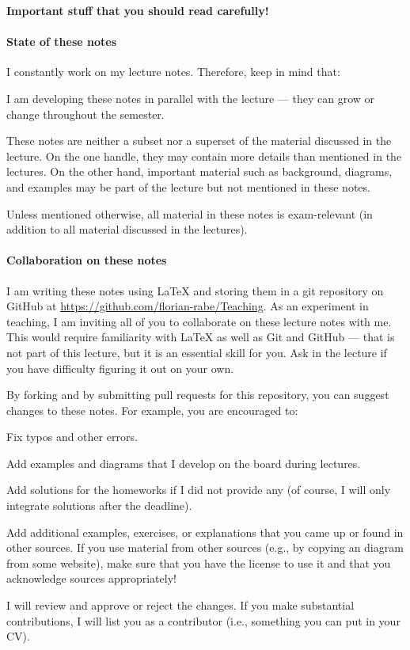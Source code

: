\begin{center}
\textbf{Important stuff that you should read carefully!}
\end{center}

\paragraph{State of these notes}
I constantly work on my lecture notes.
Therefore, keep in mind that:
\begin{compactitem}
\item I am developing these notes in parallel with the lecture --- they can grow or change throughout the semester.
\item These notes are neither a subset nor a superset of the material discussed in the lecture. On the one handle, they may contain more details than mentioned in the lectures. On the other hand, important material such as background, diagrams, and examples may be part of the lecture but not mentioned in these notes.
\item Unless mentioned otherwise, all material in these notes is exam-relevant (in addition to all material discussed in the lectures).
\end{compactitem}
\medskip

\paragraph{Collaboration on these notes}
I am writing these notes using LaTeX and storing them in a git repository on GitHub at \url{https://github.com/florian-rabe/Teaching}.
As an experiment in teaching, I am inviting all of you to collaborate on these lecture notes with me.
This would require familiarity with LaTeX as well as Git and GitHub --- that is not part of this lecture, but it is an essential skill for you.
Ask in the lecture if you have difficulty figuring it out on your own.
\medskip

By forking and by submitting pull requests for this repository, you can suggest changes to these notes.
For example, you are encouraged to:
\begin{compactitem}
\item Fix typos and other errors.
\item Add examples and diagrams that I develop on the board during lectures.
\item Add solutions for the homeworks if I did not provide any (of course, I will only integrate solutions after the deadline).
\item Add additional examples, exercises, or explanations that you came up or found in other sources.
 If you use material from other sources (e.g., by copying an diagram from some website), make sure that you have the license to use it and that you acknowledge sources appropriately!
\end{compactitem}
I will review and approve or reject the changes.
If you make substantial contributions, I will list you as a contributor (i.e., something you can put in your CV).
\medskip

